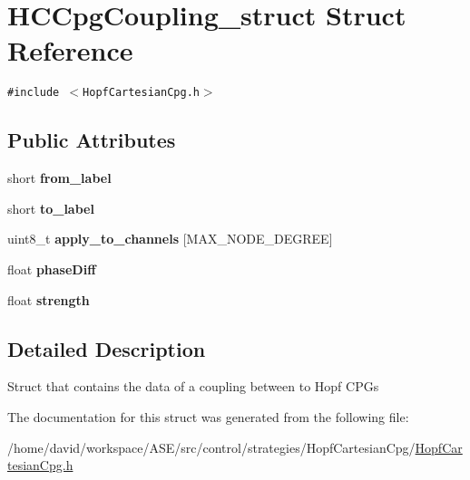 \hypertarget{structHCCpgCoupling__struct}{
\section{HCCpgCoupling\_\-struct Struct Reference}
\label{structHCCpgCoupling__struct}
}
{\tt \#include $<$HopfCartesianCpg.h$>$}

\subsection*{Public Attributes}
\begin{CompactItemize}
\item 
\hypertarget{structHCCpgCoupling__struct_6de3283f18840d8747ba21ec825207e1}{
short \textbf{from\_\-label}}
\label{structHCCpgCoupling__struct_6de3283f18840d8747ba21ec825207e1}

\item 
\hypertarget{structHCCpgCoupling__struct_bd9068034965e6acb3ca71c051b6c2ce}{
short \textbf{to\_\-label}}
\label{structHCCpgCoupling__struct_bd9068034965e6acb3ca71c051b6c2ce}

\item 
\hypertarget{structHCCpgCoupling__struct_1b9a9c48817fb3a7d243d81aef9a5e95}{
uint8\_\-t \textbf{apply\_\-to\_\-channels} \mbox{[}MAX\_\-NODE\_\-DEGREE\mbox{]}}
\label{structHCCpgCoupling__struct_1b9a9c48817fb3a7d243d81aef9a5e95}

\item 
\hypertarget{structHCCpgCoupling__struct_13ee6a8a1adef3def804500171bfbf05}{
float \textbf{phaseDiff}}
\label{structHCCpgCoupling__struct_13ee6a8a1adef3def804500171bfbf05}

\item 
\hypertarget{structHCCpgCoupling__struct_53d33d48168cf85550316654ee58a039}{
float \textbf{strength}}
\label{structHCCpgCoupling__struct_53d33d48168cf85550316654ee58a039}

\end{CompactItemize}


\subsection{Detailed Description}
Struct that contains the data of a coupling between to Hopf CPGs 

The documentation for this struct was generated from the following file:\begin{CompactItemize}
\item 
/home/david/workspace/ASE/src/control/strategies/HopfCartesianCpg/\hyperlink{HopfCartesianCpg_8h}{HopfCartesianCpg.h}\end{CompactItemize}

